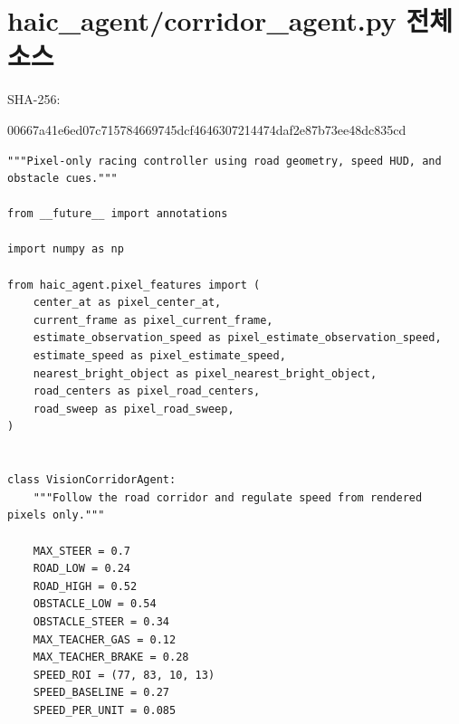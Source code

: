 \documentclass[11pt,a4paper]{article}
\begin{document}
\section{haic\_agent/corridor\_agent.py 전체 소스}
{\footnotesize SHA-256:\par\ttfamily 00667a41e6ed07c715784669745dcf4646307214474daf2e87b73ee48dc835cd}
\begin{lstlisting}
"""Pixel-only racing controller using road geometry, speed HUD, and obstacle cues."""

from __future__ import annotations

import numpy as np

from haic_agent.pixel_features import (
    center_at as pixel_center_at,
    current_frame as pixel_current_frame,
    estimate_observation_speed as pixel_estimate_observation_speed,
    estimate_speed as pixel_estimate_speed,
    nearest_bright_object as pixel_nearest_bright_object,
    road_centers as pixel_road_centers,
    road_sweep as pixel_road_sweep,
)


class VisionCorridorAgent:
    """Follow the road corridor and regulate speed from rendered pixels only."""

    MAX_STEER = 0.7
    ROAD_LOW = 0.24
    ROAD_HIGH = 0.52
    OBSTACLE_LOW = 0.54
    OBSTACLE_STEER = 0.34
    MAX_TEACHER_GAS = 0.12
    MAX_TEACHER_BRAKE = 0.28
    SPEED_ROI = (77, 83, 10, 13)
    SPEED_BASELINE = 0.27
    SPEED_PER_UNIT = 0.085


\end{lstlisting}
\end{document}
